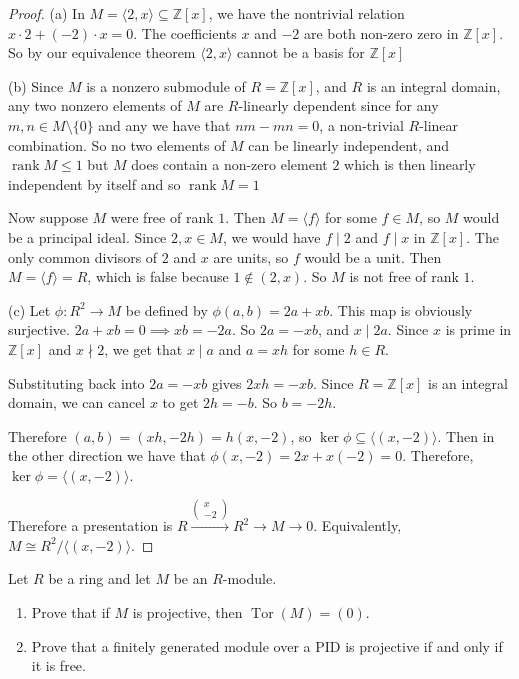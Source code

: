 \documentclass[addpoints,10pt]{exam}
\theoremstyle{plain}
\theoremstyle{definition}
\newtheorem{prob}[thm]{Problem}
\theoremstyle{plain}
\theoremstyle{plain}
\theoremstyle{definition}
\let\oldprob\prob
\let\endoldprob\endprob
\renewenvironment{prob}
  {\begin{singlespace}\oldprob}
  {\endoldprob\end{singlespace}}
\newcommand{\ZZ}{\ensuremath{\mathbb{Z}}}
\newcommand{\rank}{\ensuremath{\operatorname{rank}}}
\newcommand{\Tor}{\ensuremath{\operatorname{Tor}}}
\begin{document}
\begin{proof}
(a)
In $M=\langle 2,x\rangle\subseteq \ZZ[x]$, we have the nontrivial relation
$x\cdot 2+(-2)\cdot x=0$. The coefficients $x$ and $-2$ are both non-zero
zero in $\ZZ[x]$. So by our equivalence theorem $\langle 2,x\rangle$ cannot be a basis for $\ZZ[x]$

(b)
Since $M$ is a nonzero submodule of $R=\ZZ[x]$, and $R$ is an integral
domain, any two nonzero elements of $M$ are $R$-linearly dependent since for any $m,n\in M\setminus\{0\}$ and any we have that $nm-mn=0$, a non-trivial $R$-linear combination. So no
two elements of $M$ can be linearly independent, and $\rank M\leq 1$ but $M$ does contain a non-zero element $2$ which is then linearly independent by itself and so $\rank M=1$

Now suppose $M$ were free of rank $1$. Then $M=\langle f\rangle$ for
some $f\in M$, so $M$ would be a principal ideal. Since $2,x\in M$, we
would have $f\mid 2$ and $f\mid x$ in $\ZZ[x]$. The only common divisors
of $2$ and $x$ are units, so $f$ would be a unit. Then
$M=\langle f\rangle=R$, which is false because $1\notin (2,x)$. So
$M$ is not free of rank $1$.

(c)
Let $\phi:R^2\to M$ be defined by $\phi(a,b)=2a+xb$. This map is obviously surjective.
$2a+xb=0\implies xb=-2a$. So $2a=-xb$, and $x\mid 2a$. Since $x$ is prime in $\ZZ[x]$ and
$x\nmid 2$, we get that $x\mid a$ and $a=xh$ for some $h\in R$.

Substituting back into $2a=-xb$ gives $2xh=-xb$. Since $R=\ZZ[x]$ is an
integral domain, we can cancel $x$ to get $2h=-b$. So $b=-2h$.

Therefore $(a,b)=(xh,-2h)=h(x,-2)$, so
$\ker\phi\subseteq \langle (x,-2)\rangle$.
Then in the other direction we have that
$\phi(x,-2)=2x+x(-2)=0$. Therefore, $\ker\phi=\langle (x,-2)\rangle$.

Therefore a presentation is
$R\xrightarrow{\begin{pmatrix}x\\-2\end{pmatrix}}R^2\to M\to 0$.
Equivalently, $M\cong R^2/\langle (x,-2)\rangle$.

\end{proof}


\newpage

\begin{prob}
Let $R$ be a ring and let $M$ be an $R$-module.

\begin{enumerate}[label=(\alph*)]
\item Prove that if $M$ is projective, then $\Tor(M)=(0)$.

\item Prove that a finitely generated module over a PID is projective if and only if it is free.
\end{enumerate}
\end{prob}
\end{document}
